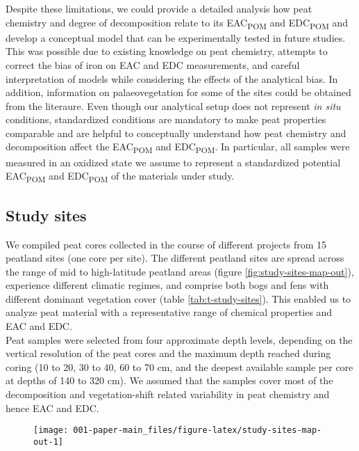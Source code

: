 \documentclass[alpha-refs]{wiley-article-rmd}
\begin{document}
\begin{refsection}
Despite these limitations, we could provide a detailed analysis how peat chemistry and degree of decomposition relate to its EAC\textsubscript{POM} and EDC\textsubscript{POM} and develop a conceptual model that can be experimentally tested in future studies. This was possible due to existing knowledge on peat chemistry, attempts to correct the bias of iron on EAC and EDC measurements, and careful interpretation of models while considering the effects of the analytical bias. In addition, information on palaeovegetation for some of the sites could be obtained from the literaure. Even though our analytical setup does not represent \emph{in situ} conditions, standardized conditions are mandatory to make peat properties comparable and are helpful to conceptually understand how peat chemistry and decomposition affect the EAC\textsubscript{POM} and EDC\textsubscript{POM}. In particular, all samples were measured in an oxidized state we assume to represent a standardized potential EAC\textsubscript{POM} and EDC\textsubscript{POM} of the materials under study.

\hypertarget{study-sites}{%
\subsection{Study sites}\label{study-sites}}

We compiled peat cores collected in the course of different projects from 15 peatland sites (one core per site). The different peatland sites are spread across the range of mid to high-latitude peatland areas (figure \ref{fig:study-sites-map-out}), experience different climatic regimes, and comprise both bogs and fens with different dominant vegetation cover (table \ref{tab:t-study-sites}). This enabled us to analyze peat material with a representative range of chemical properties and EAC and EDC.\\
Peat samples were selected from four approximate depth levels, depending on the vertical resolution of the peat cores and the maximum depth reached during coring (10 to 20, 30 to 40, 60 to 70 cm, and the deepest available sample per core at depths of 140 to 320 cm). We assumed that the samples cover most of the decomposition and vegetation-shift related variability in peat chemistry and hence EAC and EDC.

\begin{figure}[H]

{\centering \texttt{[image: 001-paper-main\_files/figure-latex/study-sites-map-out-1]}

}
\end{figure}
\end{refsection}
\end{document}
